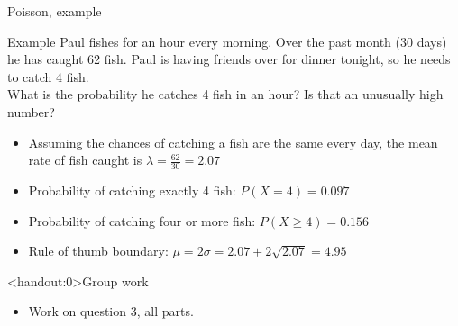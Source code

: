 \documentclass[xcolor=table, handout]{beamer}
\begin{document}
\begin{frame}{Poisson, example}
\begin{exampleblock}{Example}
Paul fishes for an hour every morning. Over the past month (30 days) he has caught 62 fish. Paul is having friends over for dinner tonight, so he needs to catch 4 fish.\\
\medskip
What is the probability he catches 4 fish in an hour? Is that an unusually high number?
\begin{itemize}
\pause\item Assuming the chances of catching a fish are the same every day, the mean rate of fish caught is $\lambda = \frac {62}{30} = 2.07$
\pause\item Probability of catching exactly 4 fish: $P(X=4) = 0.097$
\pause\item Probability of catching four or more fish: $P(X \ge 4) = 0.156$
\pause\item Rule of thumb boundary: $\mu = 2 \sigma = 2.07 + 2 \sqrt{2.07} = 4.95$ 
\end{itemize}
\end{exampleblock}
\end{frame}

\begin{frame}<handout:0>{Group work}
\begin{block}{}
\large
\begin{itemize}
\item Work on question 3, all parts.
\end{itemize}
\end{block}
\end{frame}
\end{document}
